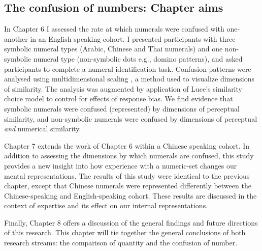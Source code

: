 \subsection{The confusion of numbers: Chapter aims}
In Chapter 6 I assessed the rate at which numerals were confused with one-another in an English speaking cohort. I presented participants with three symbolic numeral types (Arabic, Chinese and Thai numerals) and one non-symbolic numeral type (non-symbolic dots e.g., domino patterns), and asked participants to complete a numeral identification task. Confusion patterns were analysed using multidimensional scaling \cite{shepard1962originalMDS1, shepard1962originalMDS2, kruskal1964nonmetric}, a method used to visualize dimensions of similarity. The analysis was augmented by application of Luce's similarity choice model \cite{luce1963detection} to control for effects of response bias. We find evidence that symbolic numerals were confused (represented) by dimensions of perceptual similarity, and non-symbolic numerals were confused by dimensions of perceptual \textit{and} numerical similarity. 

Chapter 7 extends the work of Chapter 6 within a Chinese speaking cohort. In addition to assessing the dimensions by which numerals are confused, this study provides a new insight into how experience with a numeric-set changes our mental representations. The results of this study were identical to the previous chapter, except that Chinese numerals were represented differently between the Chinese-speaking and English-speaking cohort. These results are discussed in the context of expertise and its effect on our internal representations. 

Finally, Chapter 8 offers a discussion of the general findings and future directions of this research. This chapter will tie together the general conclusions of both research streams: the comparison of quantity and the confusion of number.


